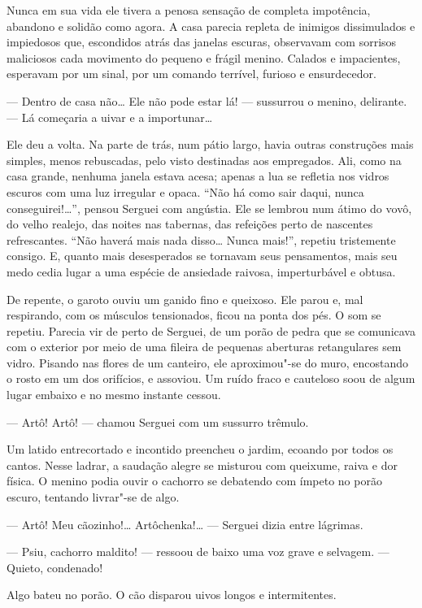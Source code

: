 Nunca em sua vida ele tivera a penosa sensação de completa impotência,
abandono e solidão como agora. A casa parecia repleta de inimigos
dissimulados e impiedosos que, escondidos atrás das janelas escuras,
observavam com sorrisos maliciosos cada movimento do pequeno e frágil
menino. Calados e impacientes, esperavam por um sinal, por um comando
terrível, furioso e ensurdecedor.

--- Dentro de casa não\ldots{} Ele não pode estar lá! --- sussurrou o
menino, delirante. --- Lá começaria a uivar e a importunar\ldots{}

Ele deu a volta. Na parte de trás, num pátio largo, havia outras
construções mais simples, menos rebuscadas, pelo visto destinadas aos
empregados. Ali, como na casa grande, nenhuma janela estava acesa;
apenas a lua se refletia nos vidros escuros com uma luz irregular e
opaca. ``Não há como sair daqui, nunca conseguirei!\ldots{}'', pensou Serguei
com angústia. Ele se lembrou num átimo do vovô, do velho realejo, das
noites nas tabernas, das refeições perto de nascentes refrescantes.
``Não haverá mais nada disso\ldots{} Nunca mais!'', repetiu tristemente
consigo. E, quanto mais desesperados se tornavam seus pensamentos, mais
seu medo cedia lugar a uma espécie de ansiedade raivosa,
imperturbável e obtusa.

De repente, o garoto ouviu um ganido fino e queixoso. Ele parou e, mal
respirando, com os músculos tensionados, ficou na ponta dos pés. O som
se repetiu. Parecia vir de perto de Serguei, de um porão de pedra que se
comunicava com o exterior por meio de uma fileira de pequenas aberturas
retangulares sem vidro. Pisando nas flores de um canteiro, ele
aproximou"-se do muro, encostando o rosto em um dos orifícios, e
assoviou. Um ruído fraco e cauteloso soou de algum lugar embaixo e no
mesmo instante cessou.

--- Artô! Artô! --- chamou Serguei com um sussurro trêmulo.

Um latido entrecortado e incontido preencheu o jardim, ecoando por todos
os cantos. Nesse ladrar, a saudação alegre se misturou com queixume, raiva
e dor física. O menino podia ouvir o cachorro se debatendo com ímpeto no
porão escuro, tentando livrar"-se de algo.

--- Artô! Meu cãozinho!\ldots{} Artôchenka!\ldots{} --- Serguei dizia entre
lágrimas.

--- Psiu, cachorro maldito! --- ressoou de baixo uma voz grave e
selvagem. --- Quieto, condenado!

Algo bateu no porão. O cão disparou uivos longos e intermitentes.


